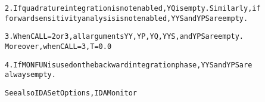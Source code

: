 \begin{alltt}
   2. If quadrature integration is not enabled, YQ is empty. Similarly, if
      forward sensitivity analysis is not enabled, YYS and YPS are empty.

   3. When CALL = 2 or 3, all arguments YY, YP, YQ, YYS, and YPS are empty.
      Moreover, when CALL = 3, T = 0.0

   4. If MONFUN is used on the backward integration phase, YYS and YPS are 
      always empty.

   See also IDASetOptions, IDAMonitor
\end{alltt}






\vspace{0.1in}
